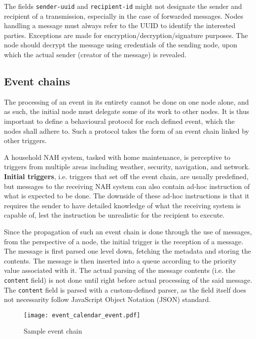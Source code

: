 \documentclass[letterpaper, twocolumn, 10pt, conference]{IEEEtran}
\newcommand{\term}[1]{\textbf{#1}}
\newcommand{\mono}[1]{\texttt{#1}}
\begin{document}
The fields \mono{sender-uuid} and \mono{recipient-id} might not designate the sender and recipient of a transmission, especially in the case of forwarded messages. Nodes handling a message must always refer to the UUID to identify the interested parties. Exceptions are made for encryption/decryption/signature purposes. The node should decrypt the message using credentials of the sending node, upon which the actual sender (creator of the message) is revealed.

\subsection{Event chains} \label{ssec:event_chains}

The processing of an event in its entirety cannot be done on one node alone, and as such, the initial node must delegate some of its work to other nodes. It is thus important to define a behavioural protocol for each defined event, which the nodes shall adhere to. Such a protocol takes the form of an event chain linked by other triggers.

A household NAH system, tasked with home maintenance, is perceptive to triggers from multiple areas including weather, security, navigation, and network. \term{Initial triggers}, i.e. triggers that set off the event chain, are usually predefined, but messages to the receiving NAH system can also contain ad-hoc instruction of what is expected to be done. The downside of these ad-hoc instructions is that it requires the sender to have detailed knowledge of what the receiving system is capable of, lest the instruction be unrealistic for the recipient to execute.

Since the propagation of such an event chain is done through the use of messages, from the perspective of a node, the initial trigger is the reception of a message. The message is first parsed one level down, fetching the metadata and storing the contents. The message is then inserted into a queue according to the priority value associated with it. The actual parsing of the message contents (i.e. the \mono{content} field) is not done until right before actual processing of the said message. The \mono{content} field is parsed with a custom-defined parser, as the field itself does not necessarity follow JavaScript Object Notation (JSON) standard. 

\begin{figure}[!h]
	\texttt{[image: event\_calendar\_event.pdf]}
	\caption{Sample event chain}
	\centering
	\label{fig:event_chain}
\end{figure}
\end{document}
